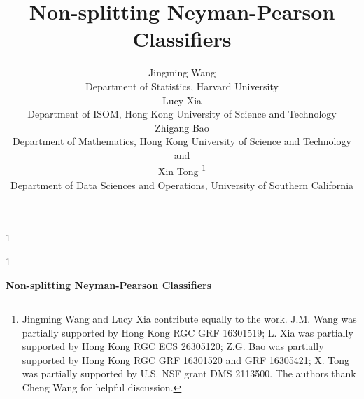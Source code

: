 \documentclass[12pt]{article}
\numberwithin{equation}{section}
\theoremstyle{remark}
\newcommand{\1}{{\rm 1}\kern-0.24em{\rm I}}
\newcommand{\blind}{1}
\begin{document}
\def\spacingset#1{\renewcommand{\baselinestretch}%
{#1}\small\normalsize} \spacingset{1}



\blind
{
  \title{\bf Non-splitting Neyman-Pearson Classifiers}
  \author{Jingming Wang \\
    Department of Statistics, Harvard University\\
Lucy Xia \\
  Department of ISOM, Hong Kong University of Science and Technology \\
	Zhigang Bao\\
	Department of Mathematics, Hong Kong University of Science and Technology\\
	and \\
	Xin Tong \thanks{Jingming Wang and Lucy Xia contribute equally to the work. J.M. Wang was partially supported by Hong Kong RGC GRF 16301519; L. Xia was partially supported by Hong Kong RGC ECS 26305120; Z.G. Bao   was partially supported by Hong Kong RGC GRF 16301520 and GRF 16305421;  X. Tong was partially supported by U.S. NSF grant DMS 2113500.  The authors thank Cheng Wang for helpful discussion.} \hspace{.2cm}\\
	Department of Data Sciences and Operations, 
	University of Southern California\\
	}
  \maketitle
} \fi

\blind
{
  \bigskip
  \bigskip
  \bigskip
  \begin{center}
    {\LARGE\bf Non-splitting Neyman-Pearson Classifiers}
\end{center}
  \medskip
} \fi

\bigskip
\end{document}
